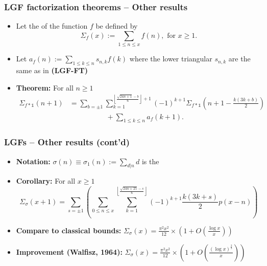 \begin{frame}
\frametitle{LGF factorization theorems -- Other results}
\begin{itemize} 

\item Let the  of the function $f$ 
      be defined by 
      \[
      \Sigma_{f}(x) := \sum_{1 \leq n \leq x} f(n), \text{ for } x \geq 1. 
      \]
\pause\item Let $a_f(n) := \sum\limits_{1 \leq k \leq n} s_{n,k} f(k)$ 
      where the lower triangular $s_{n,k}$ are the same as in \textbf{(LGF-FT)}
\pause\item \textbf{Theorem:} For all $n \geq 1$ 
      \begin{align*}
      \Sigma_{f \ast \mathds{1}}(n+1) & = \sum_{b = \pm 1} 
           \sum_{k=1}^{\left\lfloor \frac{\sqrt{24n+1}-b}{6} \right\rfloor + 1} 
	   (-1)^{k+1} \Sigma_{f \ast \mathds{1}}\left(n+1-\frac{k(3k+b)}{2}\right) \\ 
	   & \phantom{=\sum_{b = \pm 1}\ } + 
           \sum_{1 \leq k \leq n} a_f(k+1).
      \end{align*}

\end{itemize}

\end{frame}

\begin{frame}
\frametitle{LGFs -- Other results (cont'd)}
\begin{itemize} 

\item \textbf{Notation:} $\sigma(n) \equiv \sigma_1(n) := \sum\limits_{d|n} d$ is the 
\pause\item \textbf{Corollary:} For all $x \geq 1$ 
      \[
      \Sigma_{\sigma}(x+1) = \sum_{s = \pm 1} \left(\sum_{0 \leq n \leq x} 
           \sum_{k=1}^{\left\lfloor \frac{\sqrt{24n+25}-s}{6} \right\rfloor} 
           (-1)^{k+1} \frac{k(3k+s)}{2} p(x-n)\right) 
      \]
\pause\item \textbf{Compare to classical bounds:} 
      $\Sigma_{\sigma}(x) = \frac{\pi^2x^2}{12} \times \left(1 + O\left(\frac{\log x}{x}\right)\right)$
\pause\item \textbf{Improvement (Walfisz, 1964):} 
      $\Sigma_{\sigma}(x) = \frac{\pi^2x^2}{12} \times \left(1 + O\left(\frac{(\log x)^{\frac{2}{3}}}{x}\right)\right)$

\end{itemize}

\end{frame}

